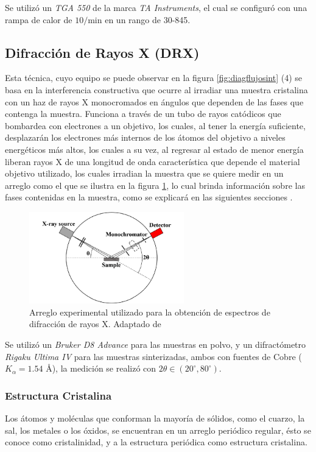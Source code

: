 \documentclass[../main.tex]{subfiles}
\begin{document}
Se utilizó un \textit{TGA 550} de la marca \textit{TA Instruments}, el cual se configuró con una rampa de calor de $10$\gradoC{}$/$min en un rango de 30\gradoC{}-845\gradoC{}.
\subsection{Difracción de Rayos X (DRX)} \label{sec:metodologiadrx}
Esta técnica, cuyo equipo se puede observar en la figura \ref{fig:diagflujosint} (4) se basa en la interferencia constructiva que ocurre al irradiar una muestra cristalina con un haz de rayos X monocromados en ángulos que dependen de las fases que contenga la muestra. Funciona a través de un tubo de rayos catódicos que bombardea con electrones a un objetivo, los cuales, al tener la energía suficiente, desplazarán los electrones más internos de los átomos del objetivo a niveles energéticos más altos, los cuales a su vez, al regresar al estado de menor energía liberan rayos X de una longitud de onda característica que depende el material objetivo utilizado, los cuales irradian la muestra que se quiere medir en un arreglo como el que se ilustra en la figura \ref{fig:diagDRX}, lo cual brinda información sobre las fases contenidas en la muestra, como se explicará en las siguientes secciones \cite{dutrowxrd}.
\begin{figure}[H]
    \centering
    \includegraphics[width=0.6\textwidth]{fig/DRXdiag.png}
    \caption{Arreglo experimental utilizado para la obtención de espectros de difracción de rayos X. Adaptado de \cite{Jung2023}}
    \label{fig:diagDRX}
\end{figure}

Se utilizó un \textit{Bruker D8 Advance} para las muestras en polvo, y un  difractómetro \textit{Rigaku Ultima IV} para las muestras sinterizadas, ambos con fuentes de Cobre ($K_\alpha=1.54$ \r{A}), la medición se realizó con $2\theta\in(20^\circ,80^\circ)$.
\subsubsection{Estructura Cristalina}
Los átomos y moléculas que conforman la mayoría de sólidos, como el cuarzo, la sal, los metales o los óxidos, se encuentran en un arreglo periódico regular, ésto se conoce como cristalinidad, y a la estructura periódica como estructura cristalina.
\end{document}

